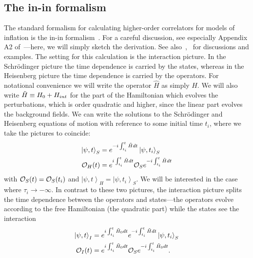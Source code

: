     \subsection{The in-in formalism}\label{sec:in_in}
The standard formalism for calculating
higher-order correlators for models of inflation is the in-in formalism~\cite{Maldacena,weinberg_in_in}.
For a careful discussion, see especially Appendix A2 of~\cite{weinberg_in_in}---here,
we will simply sketch the derivation.
See also~\cite{careful_contour},~\cite{Chen_review_2010, Babich_2004,
Renaux-Petel_2015, Meerburg_clock} for discussions and examples.
The setting for this calculation is the interaction picture. In the Schr\"{o}dinger
picture the time dependence is carried by the states, whereas in the Heisenberg picture
the time dependence is carried by the operators.
For notational convenience we will write the operator $\hat{H}$ as simply $H$.
We will also write $\tilde{H}\equiv H_0+H_{int}$ for the part of the Hamiltonian
which evolves the perturbations, which is order quadratic and higher,
since the linear part evolves the background fields.
We can write the solutions to the Schr\"{o}dinger and Heisenberg equations of motion
with reference to some initial time $t_i$, where we take the pictures to coincide:
\begin{align}
    \left|\psi,t\right>_S&=e^{-i\int_{t_i}^{t}{\tilde{H}}dt}\left|\psi,t_i\right>_S\\
    \mathcal{O}_H(t) &= e^{i\int_{t_i}^{t}{\tilde{H}}dt}\mathcal{O}_Se^{-i\int_{t_i}^{t}{\tilde{H}}dt}
\end{align}
with $\mathcal{O}_S(t)=\mathcal{O}_S(t_i)$ and $\left|\psi,t\right>_H=\left|\psi,t_i\right>_S$.
We will be interested in the case where $\tau_i\rightarrow-\infty$.
In contrast to these two pictures,
the interaction picture splits the time dependence between the operators and
states---the operators evolve according
to the free Hamiltonian (the quadratic part) while the states see the interaction
\begin{align}
    \left|\psi,t\right>_I&=e^{i\int_{t_i}^{t}{\tilde{H}}_0dt}e^{-i\int_{t_i}^{t}{\tilde{H}}dt}\left|\psi,t_i\right>_S\\
    \mathcal{O}_I(t) &= e^{i\int_{t_i}^{t}{\tilde{H}}_0dt}\mathcal{O}_Se^{-i\int_{t_i}^{t}{\tilde{H}}_0dt}.
\end{align}


